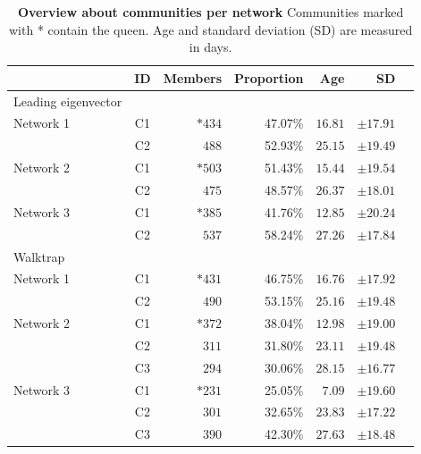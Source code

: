 \begin{table}
\centering
\caption[Overview about communities]{\textbf{Overview about communities per network} Communities marked with * contain the queen. Age and standard deviation (SD) are measured in days.}
\label{tab:communities}
\vspace*{5mm}
\begin{tabular}{lcrrrrr}
	\toprule
	{}  & ID & Members & Proportion & Age & SD\\
	\midrule
	\rowcolor{Gray}
	Leading eigenvector &&&&&\\
	\midrule 
	\quad Network 1  & C1 & $*434$  & 47.07\% & $16.81$ & $\pm17.91$ \\
	                 & C2 & $488$   & 52.93\% & $25.15$ & $\pm19.49$ \\
	\midrule   							
	\quad Network 2  & C1 & $*503$  & 51.43\% & $15.44$ & $\pm19.54$ \\
	                 & C2 & $475$   & 48.57\% & $26.37$ & $\pm18.01$ \\
	\midrule  
	\quad Network 3  & C1 & $*385$  & 41.76\% & $12.85$ & $\pm20.24$ \\
	                 & C2 & $537$   & 58.24\% & $27.26$ & $\pm17.84$ \\
    \midrule
    \rowcolor{Gray}
    Walktrap &&&&&\\
    \midrule 
	\quad Network 1 & C1 & $*431$ & 46.75\% & $16.76$ & $\pm17.92$\\
	                & C2 & $490$  & 53.15\% & $25.16$ & $\pm19.48$\\
	\midrule
	\quad Network 2 & C1 & $*372$ & 38.04\% & $12.98$ & $\pm19.00$\\
				    & C2 & $311$  & 31.80\% & $23.11$ & $\pm19.48$\\
				    & C3 & $294$  & 30.06\% & $28.15$ & $\pm16.77$\\            
	\midrule
	\quad Network 3 & C1 & $*231$  & 25.05\% & $7.09$  & $\pm19.60$\\
					& C2 & $301$  & 32.65\% & $23.83$ & $\pm17.22$\\
					& C3 & $390$  & 42.30\% & $27.63$ & $\pm18.48$\\
	\bottomrule
\end{tabular}
\end{table}

